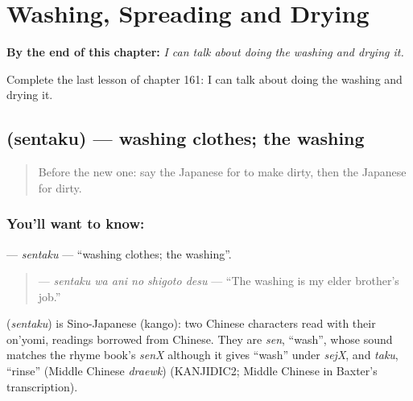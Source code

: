 
\chapter{Washing, Spreading and Drying}
\label{ch:ja-washing-spreading-and-drying}

\begin{chapteropening}
\textbf{By the end of this chapter:} \emph{I can talk about doing the washing and drying it.}

Complete the last lesson of chapter 161: I can talk about doing the washing and drying it.
\end{chapteropening}

\section[\texorpdfstring{\ja{せんたく} (sentaku)}{せんたく (sentaku)}]{ (sentaku) — washing clothes; the washing}

\label{lesson:JA-C161-sentaku}



\begin{quote}
Before the new one: say the Japanese for to make dirty, then the Japanese for dirty.
\end{quote}

\subsection*{You'll want to know: }
\textbf{} — \emph{sentaku} — \textquotedblleft{}washing clothes; the washing\textquotedblright{}.

\begin{quote}
\textbf{  } — \emph{sentaku wa ani no shigoto desu} — \textquotedblleft{}The washing is my elder brother's job.\textquotedblright{}
\end{quote}

\begin{cousinweb}
\textbf{} (\emph{sentaku}) is Sino-Japanese (kango): two Chinese characters read with their on'yomi, readings borrowed from Chinese. They are \emph{sen}, \textquotedblleft{}wash\textquotedblright{}, whose sound matches the rhyme book's \emph{senX} although it gives \textquotedblleft{}wash\textquotedblright{} under \emph{sejX}, and \emph{taku}, \textquotedblleft{}rinse\textquotedblright{} (Middle Chinese \emph{draewk}) (KANJIDIC2; Middle Chinese in Baxter's transcription).
\end{cousinweb}

